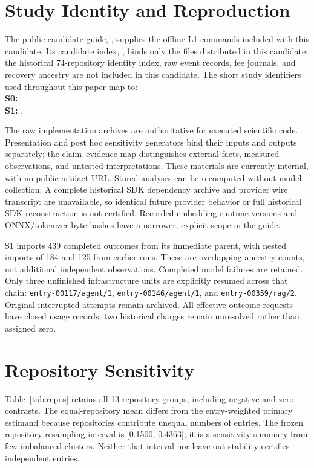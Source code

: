 \documentclass[conference,10pt,letterpaper]{IEEEtran}
\begin{document}
\section{Study Identity and Reproduction}
The public-candidate guide, , supplies the offline L1 commands included with this candidate. Its candidate index, , binds only the files distributed in this candidate; the historical 74-repository identity index, raw event records, fee journals, and recovery ancestry are not included in this candidate. The short study identifiers used throughout this paper map to:\\
\textbf{S0:} \\
\textbf{S1:} .

The raw implementation archives are authoritative for executed scientific code. Presentation and post hoc sensitivity generators bind their inputs and outputs separately; the claim--evidence map distinguishes external facts, measured observations, and untested interpretations. These materials are currently internal, with no public artifact URL. Stored analyses can be recomputed without model collection. A complete historical SDK dependency archive and provider wire transcript are unavailable, so identical future provider behavior or full historical SDK reconstruction is not certified. Recorded embedding runtime versions and ONNX/tokenizer byte hashes have a narrower, explicit scope in the guide.

S1 imports 439 completed outcomes from its immediate parent, with nested imports of 184 and 125 from earlier runs. These are overlapping ancestry counts, not additional independent observations. Completed model failures are retained. Only three unfinished infrastructure units are explicitly resumed across that chain: \texttt{entry-00117/agent/1}, \texttt{entry-00146/agent/1}, and \texttt{entry-00359/rag/2}. Original interrupted attempts remain archived. All effective-outcome requests have closed usage records; two historical charges remain unresolved rather than assigned zero.

\section{Repository Sensitivity}

Table~\ref{tab:repos} retains all 13 repository groups, including negative and zero contrasts. The equal-repository mean differs from the entry-weighted primary estimand because repositories contribute unequal numbers of entries. The frozen repository-resampling interval is [0.1500, 0.4363]; it is a sensitivity summary from few imbalanced clusters. Neither that interval nor leave-out stability certifies independent entries.
\end{document}
